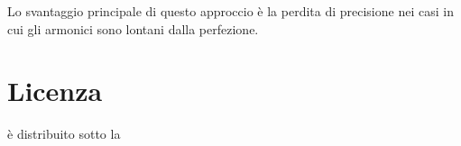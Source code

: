 Lo svantaggio principale di questo approccio è la perdita di precisione nei casi in cui gli armonici sono lontani dalla perfezione.

\appendix

\chapter{Licenza}\label{license}

 è distribuito sotto la 





